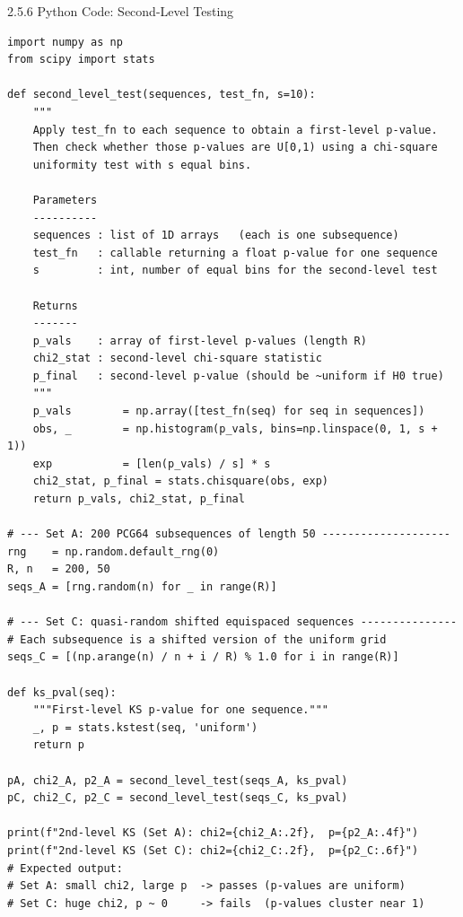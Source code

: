 \documentclass[aspectratio=169,10pt]{beamer}
\begin{document}
\begin{frame}[fragile]{2.5.6 Python Code: Second-Level Testing}

\begin{lstlisting}[style=python]
import numpy as np
from scipy import stats

def second_level_test(sequences, test_fn, s=10):
    """
    Apply test_fn to each sequence to obtain a first-level p-value.
    Then check whether those p-values are U[0,1) using a chi-square
    uniformity test with s equal bins.

    Parameters
    ----------
    sequences : list of 1D arrays   (each is one subsequence)
    test_fn   : callable returning a float p-value for one sequence
    s         : int, number of equal bins for the second-level test

    Returns
    -------
    p_vals    : array of first-level p-values (length R)
    chi2_stat : second-level chi-square statistic
    p_final   : second-level p-value (should be ~uniform if H0 true)
    """
    p_vals        = np.array([test_fn(seq) for seq in sequences])
    obs, _        = np.histogram(p_vals, bins=np.linspace(0, 1, s + 1))
    exp           = [len(p_vals) / s] * s
    chi2_stat, p_final = stats.chisquare(obs, exp)
    return p_vals, chi2_stat, p_final

# --- Set A: 200 PCG64 subsequences of length 50 --------------------
rng    = np.random.default_rng(0)
R, n   = 200, 50
seqs_A = [rng.random(n) for _ in range(R)]

# --- Set C: quasi-random shifted equispaced sequences ---------------
# Each subsequence is a shifted version of the uniform grid
seqs_C = [(np.arange(n) / n + i / R) % 1.0 for i in range(R)]

def ks_pval(seq):
    """First-level KS p-value for one sequence."""
    _, p = stats.kstest(seq, 'uniform')
    return p

pA, chi2_A, p2_A = second_level_test(seqs_A, ks_pval)
pC, chi2_C, p2_C = second_level_test(seqs_C, ks_pval)

print(f"2nd-level KS (Set A): chi2={chi2_A:.2f},  p={p2_A:.4f}")
print(f"2nd-level KS (Set C): chi2={chi2_C:.2f},  p={p2_C:.6f}")
# Expected output:
# Set A: small chi2, large p  -> passes (p-values are uniform)
# Set C: huge chi2, p ~ 0     -> fails  (p-values cluster near 1)
\end{lstlisting}

\end{frame}
\end{document}
